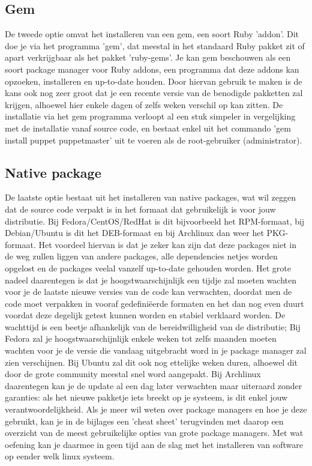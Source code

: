 \subsection{Gem}
De tweede optie omvat het installeren van een gem, een soort Ruby 'addon'. Dit doe je via het programma 'gem', dat meestal in het standaard Ruby pakket zit of apart verkrijgbaar als het pakket 'ruby-gems'. Je kan gem beschouwen als een soort package manager voor Ruby addons, een programma dat deze addons kan opzoeken, installeren en up-to-date houden. Door hiervan gebruik te maken is de kans ook nog zeer groot dat je een recente versie van de benodigde pakketten zal krijgen, alhoewel hier enkele dagen of zelfs weken verschil op kan zitten. De installatie via het gem programma verloopt al een stuk simpeler in vergelijking met de installatie vanaf source code, en bestaat enkel uit het commando 'gem install puppet puppetmaster' uit te voeren als de root-gebruiker (administrator).
%
\subsection{Native package}
De laatste optie bestaat uit het installeren van native packages, wat wil zeggen dat de source code verpakt is in het formaat dat gebruikelijk is voor jouw distributie. Bij Fedora/CentOS/RedHat is dit bijvoorbeeld het RPM-formaat, bij Debian/Ubuntu is dit het DEB-formaat en bij Archlinux dan weer het PKG-formaat. Het voordeel hiervan is dat je zeker kan zijn dat deze packages niet in de weg zullen liggen van andere packages, alle dependencies netjes worden opgelost en de packages veelal vanzelf up-to-date gehouden worden. Het grote nadeel daarentegen is dat je hoogstwaarschijnlijk een tijdje zal moeten wachten voor je de laatste nieuwe versies van de code kan verwachten, doordat men de code moet verpakken in vooraf gedefini\"{e}erde formaten en het dan nog even duurt voordat deze degelijk getest kunnen worden en stabiel verklaard worden. De wachttijd is een beetje afhankelijk van de bereidwilligheid van de distributie; Bij Fedora zal je hoogstwaarschijnlijk enkele weken tot zelfs maanden moeten wachten voor je de versie die vandaag uitgebracht word in je package manager zal zien verschijnen. Bij Ubuntu zal dit ook nog ettelijke weken duren, alhoewel dit door de grote community meestal snel word aangepakt. Bij Archlinux daarentegen kan je de update al een dag later verwachten maar uiteraard zonder garanties: als het nieuwe pakketje iets breekt op je systeem, is dit enkel jouw verantwoordelijkheid. Als je meer wil weten over package managers en hoe je deze gebruikt, kan je in de bijlages een 'cheat sheet' terugvinden met daarop een overzicht van de meest gebruikelijke opties van grote package managers. Met wat oefening kan je daarmee in geen tijd aan de slag met het installeren van software op eender welk linux systeem.

